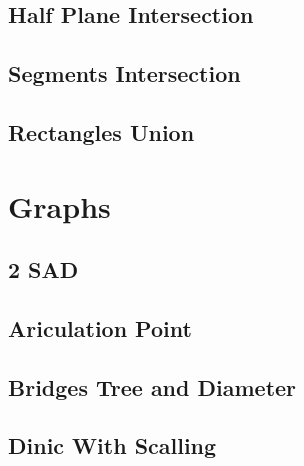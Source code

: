 \subsection{Half Plane Intersection}
\vspace{-2ex}
\raggedbottom
\vspace{-3.2ex}
\hrulefill
\subsection{Segments Intersection}
\vspace{-2ex}
\raggedbottom
\vspace{-3.2ex}
\hrulefill
\subsection{Rectangles Union}
\vspace{-2ex}
\raggedbottom
\vspace{-3.2ex}
\hrulefill

\section{Graphs}
\subsection{2 SAD}
\vspace{-2ex}
\raggedbottom
\vspace{-3.2ex}
\hrulefill
\subsection{Ariculation Point}
\vspace{-2ex}
\raggedbottom
\vspace{-3.2ex}
\hrulefill
\subsection{Bridges Tree and Diameter}
\vspace{-2ex}
\raggedbottom
\vspace{-3.2ex}
\hrulefill
\subsection{Dinic With Scalling}
\vspace{-2ex}
\raggedbottom
\vspace{-3.2ex}
\hrulefill
